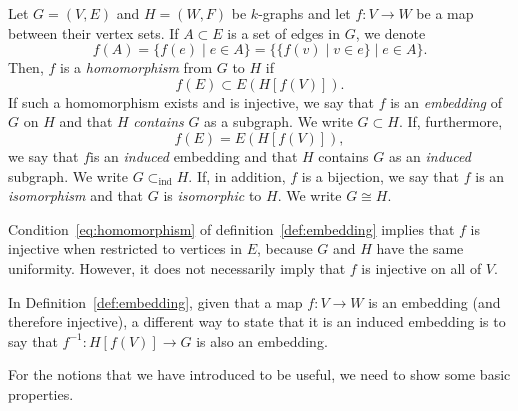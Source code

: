 \begin{definition} \label{def:embedding}
    Let $G = (V, E)$ and $H = (W, F)$ be $k$-graphs and let $f: V \to W$ be a map
    between their vertex sets.
    If $A \subset E$ is a set of edges in $G$, we denote
    \[
        f(A) = \{f(e) \mid e \in A\} = \{\{f(v) \mid v \in e\} \mid e \in A\}.
    \]
    Then, $f$ is a \emph{homomorphism} from $G$ to $H$ if
    \begin{equation}
        \label{eq:homomorphism}
        f(E) \subset E(H[f(V)]).
    \end{equation}
    If such a homomorphism exists
    and is injective, we say that $f$ is an \emph{embedding} of $G$ on $H$
    and that $H$ \emph{contains} $G$ as a subgraph.
    We write $G \subset H$.
    If, furthermore,
    \begin{equation}
        \label{eq:induced_embedding}
        f(E) = E(H[f(V)]),
    \end{equation}
    we say that $f$is an \emph{induced} embedding
    and that $H$ contains $G$ as an \emph{induced} subgraph.
    We write $G \subset_{\text{ind}} H$.
    If, in addition, $f$ is a bijection, we say that $f$ is an \emph{isomorphism}
    and that $G$ is \emph{isomorphic} to $H$.
    We write $G \cong H$.
\end{definition}

\begin{remark}
    Condition~\eqref{eq:homomorphism} of definition~\ref{def:embedding}
    implies that $f$ is injective
    when restricted to vertices in $E$, because $G$ and $H$ have the same uniformity.
    However, it does not necessarily imply that $f$ is injective on all of $V$.
\end{remark}

\begin{remark} \label{rem:inverse_embedding}
    In Definition~\ref{def:embedding}, given that a map $f: V \to W$ is an embedding
    (and therefore injective),
    a different way to state that it is an induced embedding is to say that
    $f^{-1}: H[f(V)] \to G$ is also an embedding.
\end{remark}

For the notions that we have introduced to be useful,
we need to show some basic properties.

